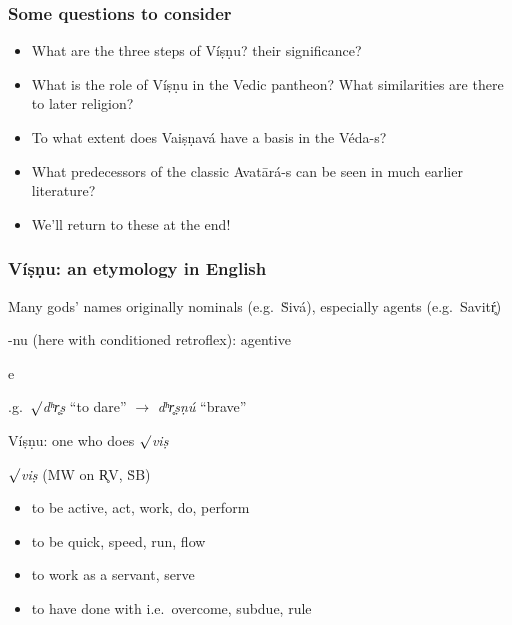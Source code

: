 \documentclass[pdf]{beamer}
\newcommand{\Subitem}[1]{{\setlength\itemindent{12pt} \item[-] #1}}
\begin{document}
\begin{frame}[label=questions] \frametitle{Some questions to consider}
\begin{itemize}
	\item What are the three steps of Víṣṇu? their significance?
	\item What is the role of Víṣṇu in the Vedic pantheon? What similarities are there to later religion?
	\item To what extent does Vaiṣṇavá have a basis in the Véda-s?
	\item What predecessors of the classic Avatārá-s can be seen in much earlier literature?
	\item We'll return to these at the end!
\end{itemize}
\end{frame}

\begin{frame} \frametitle{Víṣṇu: an etymology in English}
\begin{itemize}
	\item Many gods' names originally nominals (e.g.~Ṡivá), especially agents (e.g.~Savitŕ̥)
	\item -nu (here with conditioned retroflex): agentive
	\Subitem e.g.~$\surd$\textit{dʰr̥ṣ} ``to dare'' $\rightarrow$ \textit{dʰr̥ṣṇú} ``brave''
	\item Víṣṇu: one who does $\surd$\textit{viṣ}
\end{itemize}

\begin{block} {$\surd$\textit{viṣ} (MW on R̥V, ṠB)}
\begin{itemize}
	\item to be active, act, work, do, perform
	\item to be quick, speed, run, flow
	\item to work as a servant, serve
	\item to have done with i.e.~overcome, subdue, rule
\end{itemize}
\end{block}
\end{frame}
\end{document}
